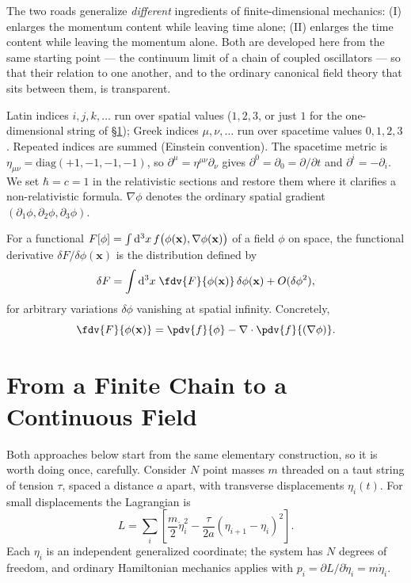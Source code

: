 The two roads generalize \emph{different} ingredients of finite-dimensional
mechanics: (I) enlarges the momentum content while leaving time alone; (II)
enlarges the time content while leaving the momentum alone. Both are developed
here from the same starting point --- the continuum limit of a chain of coupled
oscillators --- so that their relation to one another, and to the ordinary
canonical field theory that sits between them, is transparent.

Latin indices $i,j,k,\dots$ run over spatial values ($1,2,3$, or just $1$ for
the one-dimensional string of \S\ref{sec:continuum-limit}); Greek indices
$\mu,\nu,\dots$ run over spacetime values $0,1,2,3$. Repeated indices are
summed (Einstein convention). The spacetime metric is
$\eta_{\mu\nu}=\mathrm{diag}(+1,-1,-1,-1)$, so
$\partial^\mu=\eta^{\mu\nu}\partial_\nu$ gives
$\partial^0=\partial_0=\partial/\partial t$ and $\partial^i=-\partial_i$. We
set $\hbar=c=1$ in the relativistic sections and restore them where it
clarifies a non-relativistic formula. $\nabla\phi$ denotes the ordinary spatial
gradient $(\partial_1\phi,\partial_2\phi,\partial_3\phi)$.

\begin{definition}
\label{def:funcderiv}
For a functional $F[\phi]=\int \mathrm{d}^3x\,
    f\big(\phi(\mathbf{x}),\nabla\phi(\mathbf{x})\big)$ of a field $\phi$ on
    space, the functional derivative $\delta F/\delta\phi(\mathbf{x})$ is the
    distribution defined by
\begin{equation}
\delta F = \int \rd^3x\; \fdv{F}{\phi(\mathbf{x})}\,\delta\phi(\mathbf{x}) 
    + O(\delta\phi^2),
\end{equation}
for arbitrary variations $\delta\phi$ vanishing at spatial infinity. Concretely,
\begin{equation}
\fdv{F}{\phi(\mathbf{x})} = \pdv{f}{\phi} - \nabla\cdot\pdv{f}{(\nabla\phi)}.
\end{equation}
\end{definition}

\section{From a Finite Chain to a Continuous Field}
\label{sec:continuum-limit}

Both approaches below start from the same elementary construction, so it is
worth doing once, carefully. Consider $N$ point masses $m$ threaded on a taut
string of tension $\tau$, spaced a distance $a$ apart, with transverse
displacements $\eta_i(t)$. For small displacements the Lagrangian is
\begin{equation}
L = \sum_{i} \left[\frac{m}{2}\dot\eta_i^2 - 
    \frac{\tau}{2a}(\eta_{i+1}-\eta_i)^2\right].
\end{equation}
Each $\eta_i$ is an independent generalized coordinate; the system has $N$
degrees of freedom, and ordinary Hamiltonian mechanics applies with
$p_i=\partial L/\partial\dot\eta_i = m\dot\eta_i$.

